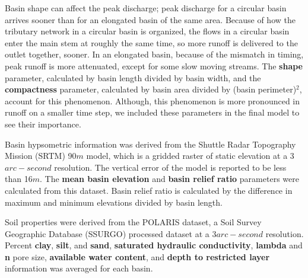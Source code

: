 Basin shape can affect the peak discharge; peak discharge for a circular basin arrives sooner than for an elongated basin of the same area. Because of how the tributary network in a circular basin is organized, the flows in a circular basin enter the main stem at roughly the same time, so more runoff is delivered to the outlet together, sooner. In an elongated basin, because of the mismatch in timing, peak runoff is more attenuated, except for some slow moving streams. The \textbf{shape} parameter, calculated by basin length divided by basin width, and the \textbf{compactness} parameter, calculated by basin area divided by (basin perimeter)$^2$, account for this phenomenon. Although, this phenomenon is more pronounced in runoff on a smaller time step, we included these parameters in the final model to see their importance. 

Basin hypsometric information was derived from the Shuttle Radar Topography Mission (SRTM) 90$m$ model, which is a gridded raster of static elevation at a 3$arc-second$ resolution. The vertical error of the model is reported to be less than 16$m$. The \textbf{mean basin elevation} and \textbf{basin relief ratio} parameters \cite{pike1971elevation} were calculated from this dataset. Basin relief ratio is calculated by the difference in maximum and minimum elevations divided by basin length. 

Soil properties were derived from the POLARIS dataset, a Soil Survey Geographic Database (SSURGO) processed dataset at a 3$arc-second$ resolution. Percent \textbf{clay}, \textbf{silt}, and \textbf{sand}, \textbf{saturated hydraulic conductivity}, \textbf{lambda} and \textbf{n} pore size, \textbf{available water content}, and \textbf{depth to restricted layer} information was averaged for each basin. 


